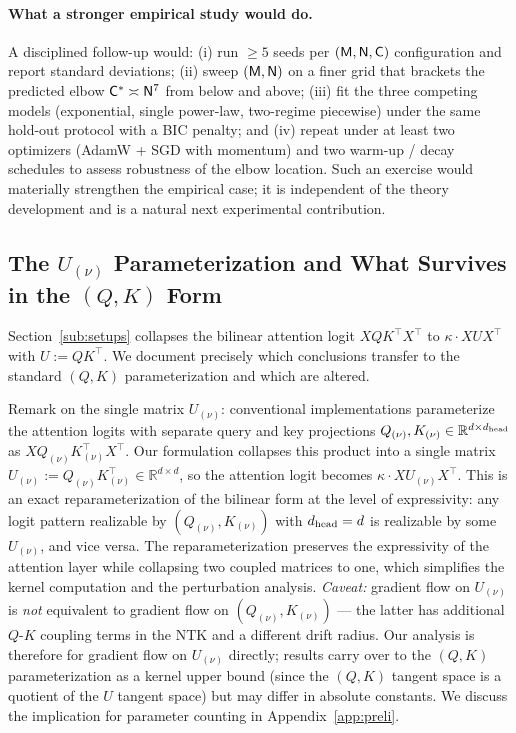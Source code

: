\documentclass[11pt]{article}
\theoremstyle{plain}
\newcommand{\R}{\mathbb{R}}
\begin{document}
\paragraph{What a stronger empirical study would do.}
A disciplined follow-up would: (i) run $\ge 5$ seeds per $({\sf M},{\sf N},{\sf C})$ configuration and report standard deviations; (ii) sweep $({\sf M},{\sf N})$ on a finer grid that brackets the predicted elbow ${\sf C}^*\asymp{\sf N}^7$ from below and above; (iii) fit the three competing models (exponential, single power-law, two-regime piecewise) under the same hold-out protocol with a BIC penalty; and (iv) repeat under at least two optimizers (AdamW + SGD with momentum) and two warm-up / decay schedules to assess robustness of the elbow location. Such an exercise would materially strengthen the empirical case; it is independent of the theory development and is a natural next experimental contribution.

\subsection{The \texorpdfstring{$U_{(\nu)}$}{U} Parameterization and What Survives in the \texorpdfstring{$(Q,K)$}{(Q,K)} Form}\label{app_sub:U_parameterization}

Section~\ref{sub:setups} collapses the bilinear attention logit $X Q K^\top X^\top$ to $\kappa\cdot X U X^\top$ with $U := QK^\top$. We document precisely which conclusions transfer to the standard $(Q,K)$ parameterization and which are altered.

Remark on the single matrix $U_{(\nu)}$: conventional implementations parameterize the attention logits with separate query and key projections $Q_{(\nu)}, K_{(\nu)} \in \R^{d \times d_{\rm head}}$ as $X Q_{(\nu)} K_{(\nu)}^\top X^\top$. Our formulation collapses this product into a single matrix $U_{(\nu)} := Q_{(\nu)} K_{(\nu)}^\top \in \R^{d \times d}$, so the attention logit becomes $\kappa \cdot X U_{(\nu)} X^\top$. This is an exact reparameterization of the bilinear form at the level of expressivity: any logit pattern realizable by $(Q_{(\nu)}, K_{(\nu)})$ with $d_{\rm head} = d$ is realizable by some $U_{(\nu)}$, and vice versa. The reparameterization preserves the expressivity of the attention layer while collapsing two coupled matrices to one, which simplifies the kernel computation and the perturbation analysis. {\it Caveat:} gradient flow on $U_{(\nu)}$ is {\it not} equivalent to gradient flow on $(Q_{(\nu)}, K_{(\nu)})$ — the latter has additional $Q$-$K$ coupling terms in the NTK and a different drift radius. Our analysis is therefore for gradient flow on $U_{(\nu)}$ directly; results carry over to the $(Q,K)$ parameterization as a kernel upper bound (since the $(Q,K)$ tangent space is a quotient of the $U$ tangent space) but may differ in absolute constants. We discuss the implication for parameter counting in Appendix~\ref{app:preli}.
\end{document}
